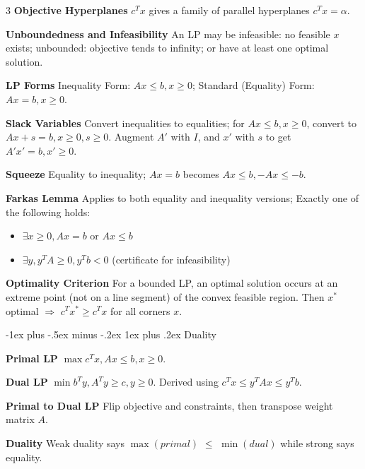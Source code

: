 \documentclass[10pt, landscape]{article}
\makeatletter
\renewcommand{\subsection}{\@startsection{subsection}{3}{0mm}%
                                {-1ex plus -.5ex minus -.2ex}%
                                {1ex plus .2ex}%
                                {\normalfont\small\bfseries}}%
\makeatother
\begin{document}
\begin{multicols*}{3}
\textbf{Objective Hyperplanes} $c^Tx$ gives a family of parallel hyperplanes $c^Tx=\alpha$.


\textbf{Unboundedness and Infeasibility} An LP may be infeasible: no feasible $x$ exists; unbounded: objective tends to infinity; or have at least one optimal solution.

\textbf{LP Forms} Inequality Form: $Ax \leq b, x \geq 0$; Standard (Equality) Form: $Ax=b, x \geq 0$.

\textbf{Slack Variables} Convert inequalities to equalities; for $Ax \leq b, x \geq 0$, convert to $Ax+s=b, x \geq 0, s \geq 0$. Augment $A'$ with $I$, and $x'$ with $s$ to get $A'x'=b,x'\geq 0$.

\textbf{Squeeze} Equality to inequality; $Ax=b$ becomes $Ax \leq b, -Ax \leq -b$.

\textbf{Farkas Lemma} Applies to both equality and inequality versions; Exactly one of the following holds:
\begin{itemize}
    \item $\exists x \geq 0, Ax =b$ or $Ax \leq b$
    \item $\exists y, y^TA \geq 0, y^Tb < 0$ (certificate for infeasibility)
\end{itemize}

\textbf{Optimality Criterion} For a bounded LP, an optimal solution occurs at an extreme point (not on a line segment) of the convex feasible region. Then $x^*$ optimal $\Rightarrow$ $c^Tx^* \geq c^Tx$ for all corners $x$.

\subsection{Duality}

\textbf{Primal LP} $\max c^Tx, Ax \leq b, x \geq 0$.

\textbf{Dual LP} $\min b^Ty, A^Ty \geq c, y \geq 0$. Derived using $c^Tx \leq y^TAx \leq y^Tb$.

\textbf{Primal to Dual LP} Flip objective and constraints, then transpose weight matrix $A$.

\textbf{Duality} Weak duality says $\max(primal)$ $\leq$ $\min(dual)$ while strong says equality.



\end{multicols*}
\end{document}
